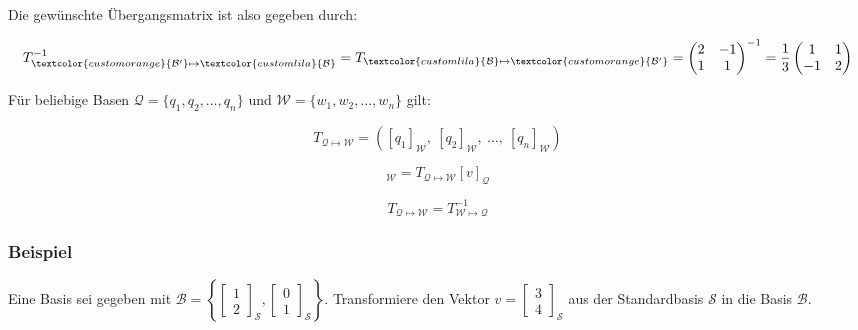 Die gewünschte Übergangsmatrix ist also gegeben durch:

\begin{equation*}
    T_{\textcolor{customorange}{\mathcal{B}'} \mapsto \textcolor{customlila}{\mathcal{B}}}^{-1} = T_{\textcolor{customlila}{\mathcal{B}} \mapsto \textcolor{customorange}{\mathcal{B'}}} =  \begin{pmatrix} 2 & -1 \\ 1 & 1 \end{pmatrix}^{-1} = \frac{1}{3} \begin{pmatrix} 1 & 1 \\ -1 & 2 \end{pmatrix}
\end{equation*}

\vspace{0.5\baselineskip}

\begin{tcolorbox}[colback=gray!30, colframe=gray!80, title=Basiswechsel für Vektoren]
    Für beliebige Basen \( \mathcal{Q} = \{ q_1, q_2, \dots, q_n \} \) und \( \mathcal{W} = \{ w_1, w_2, \dots, w_n \} \) gilt:

    \begin{equation*}
        T_{\mathcal{Q} \mapsto \mathcal{W}} = \left( [q_1]_\mathcal{W}, \ [q_2]_\mathcal{W}, \ \dots, \ [q_n]_\mathcal{W} \right)
    \end{equation*}

    \begin{equation*}
        [v]_\mathcal{W} = T_{\mathcal{Q} \mapsto \mathcal{W}} [v]_\mathcal{Q}
    \end{equation*}

    \begin{equation*}
        T_{\mathcal{Q} \mapsto \mathcal{W}} = T_{\mathcal{\mathcal{W}} \mapsto \mathcal{Q}}^{-1}
    \end{equation*}
\end{tcolorbox}

\newpage

\subsubsection*{Beispiel}

Eine Basis sei gegeben mit \( \mathcal{B} = \left\{ \begin{bmatrix} 1 \\ 2 \end{bmatrix}_\mathcal{S}, \begin{bmatrix} 0 \\ 1 \end{bmatrix}_\mathcal{S} \right\} \). Transformiere den Vektor \( v = \begin{bmatrix} 3 \\ 4 \end{bmatrix}_\mathcal{S} \) aus der Standardbasis \( \mathcal{S} \) in die Basis \( \mathcal{B} \).

